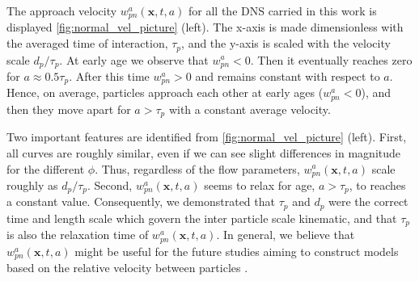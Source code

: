 The approach velocity $w_{pn}^a(\textbf{x},t,a)$ for all the DNS carried in this work is displayed \ref{fig:normal_vel_picture} (left). 
The x-axis is made dimensionless with the averaged time of interaction, $\tau_p$, and the y-axis is scaled with the velocity scale $d_p /\tau_p$. 
At  early age we observe that $w_{pn}^a<0$.
Then it eventually reaches zero for  $a \approx 0.5\tau_p$.
After this time $w_{pn}^a>0$ and remains constant with respect to $a$. 
Hence, on average, particles approach each other at early ages ($w_{pn}^a<0$), and then they move apart for $a > \tau_p$ with a constant average velocity.

Two important features are identified from \ref{fig:normal_vel_picture} (left).
First, all curves are roughly similar, even if we can see slight differences in magnitude for the different $\phi$. 
Thus, regardless of the flow parameters, $w_{pn}^a(\textbf{x},t,a)$ scale roughly as $d_p /\tau_p$. 
Second,  $w_{pn}^a(\textbf{x},t,a)$ seems to relax for age, $a > \tau_p$, to reaches a constant value. 
Consequently, we demonstrated that $\tau_p$ and $d_p$ were the correct time and length scale which govern the inter particle scale kinematic, and that $\tau_p$ is also the relaxation time of $w_{pn}^a(\textbf{x},t,a)$. 
In general, we believe that $w_{pn}^a(\textbf{x},t,a)$ might be useful for the future studies aiming to construct models based on the relative velocity between particles \citep{rao2008introduction}. 


